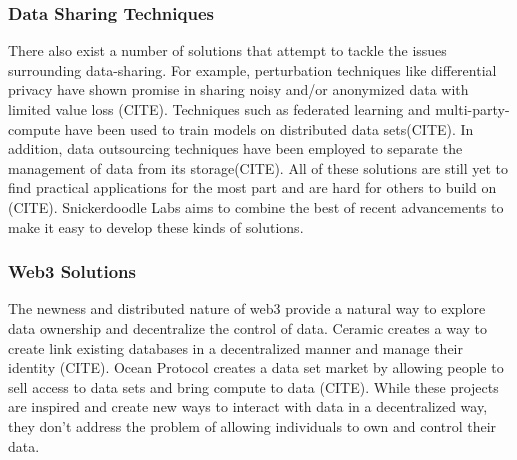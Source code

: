 \subsubsection{Data Sharing Techniques}
There also exist a number of solutions that attempt to tackle the issues surrounding data-sharing. For example, perturbation techniques like differential privacy have shown promise in sharing noisy and/or anonymized data with limited value loss (CITE). Techniques such as federated learning and  multi-party-compute have been used to train models on distributed data sets(CITE). In addition, data outsourcing techniques have been employed to separate the management of data from its storage(CITE). All of these solutions are still yet to find practical applications for the most part and are hard for others to build on (CITE). Snickerdoodle Labs aims to combine the best of recent advancements to make it easy to develop these kinds of solutions. 

\subsubsection{Web3 Solutions}
The newness and distributed nature of web3 provide a natural way to explore data ownership and decentralize the control of data. Ceramic creates a way to create link existing databases in a decentralized manner and manage their identity (CITE). Ocean Protocol creates a data set market by allowing people to sell access to data sets and bring compute to data (CITE). While these projects are inspired and create new ways to interact with data in a decentralized way, they don't address the problem of allowing individuals to own and control their data. 